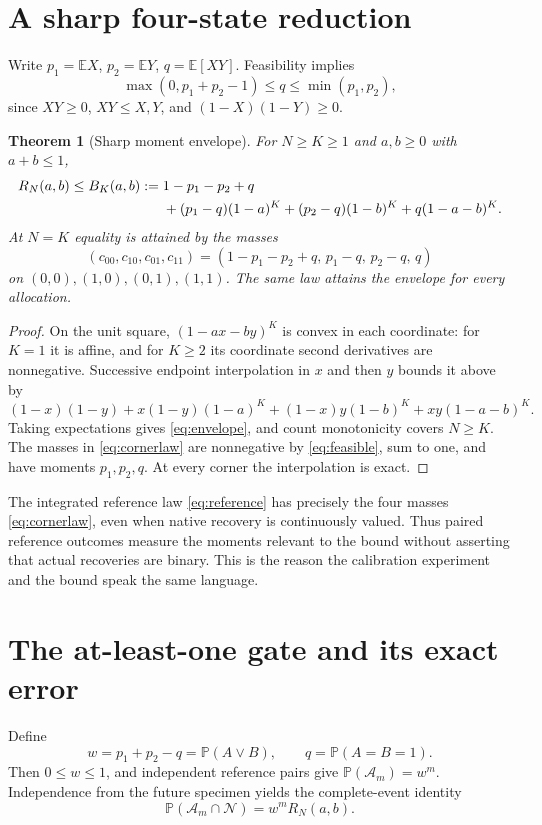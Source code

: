 \documentclass[11pt]{article}
\newtheorem{theorem}{Theorem}[section]
\theoremstyle{remark}\newtheorem{remark}[theorem]{Remark}
\newcommand{\E}{\mathbb E}
\newcommand{\Prob}{\mathbb P}
\newcommand{\Neg}{\mathcal N}
\begin{document}
\section{A sharp four-state reduction}\label{sec:corners}
Write $p_1=\E X$, $p_2=\E Y$, $q=\E[XY]$. Feasibility implies
\begin{equation}\label{eq:feasible}
\max(0,p_1+p_2-1)\le q\le\min(p_1,p_2),
\end{equation}
since $XY\ge0$, $XY\le X,Y$, and $(1-X)(1-Y)\ge0$.

\begin{theorem}[Sharp moment envelope]\label{thm:envelope}
For $N\ge K\ge1$ and $a,b\ge0$ with $a+b\le1$,
\begin{align}\label{eq:envelope}
R_N(a,b)\le B_K(a,b):={}&1-p_1-p_2+q\notag\\
&+(p_1-q)(1-a)^K+(p_2-q)(1-b)^K+q(1-a-b)^K.
\end{align}
At $N=K$ equality is attained by the masses
\begin{equation}\label{eq:cornerlaw}
(c_{00},c_{10},c_{01},c_{11})=(1-p_1-p_2+q,\,p_1-q,\,p_2-q,\,q)
\end{equation}
on $(0,0),(1,0),(0,1),(1,1)$. The same law attains the envelope for every
allocation.
\end{theorem}
\begin{proof}
On the unit square, $(1-ax-by)^K$ is convex in each coordinate: for $K=1$ it is
affine, and for $K\ge2$ its coordinate second derivatives are nonnegative.
Successive endpoint interpolation in $x$ and then $y$ bounds it above by
\[
(1-x)(1-y)+x(1-y)(1-a)^K+(1-x)y(1-b)^K+xy(1-a-b)^K.
\]
Taking expectations gives \eqref{eq:envelope}, and count monotonicity covers
$N\ge K$. The masses in \eqref{eq:cornerlaw} are nonnegative by
\eqref{eq:feasible}, sum to one, and have moments $p_1,p_2,q$. At every corner
the interpolation is exact.
\end{proof}

The integrated reference law \eqref{eq:reference} has precisely the four masses
\eqref{eq:cornerlaw}, even when native recovery is continuously valued. Thus
paired reference outcomes measure the moments relevant to the bound without
asserting that actual recoveries are binary. This is the reason the calibration
experiment and the bound speak the same language.

\section{The at-least-one gate and its exact error}\label{sec:gate}
Define
\[
w=p_1+p_2-q=\Prob(A\lor B),\qquad q=\Prob(A=B=1).
\]
Then $0\le w\le1$, and independent reference pairs give
$\Prob(\mathcal A_m)=w^m$. Independence from the future specimen yields the
complete-event identity
\begin{equation}\label{eq:joint}
\Prob(\mathcal A_m\cap\Neg)=w^m R_N(a,b).
\end{equation}
\end{document}
